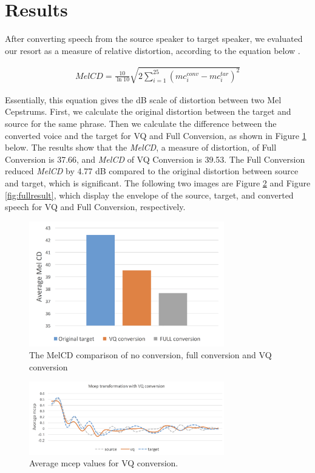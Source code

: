 \section{Results}
\label{sec:results}

After converting speech from the source speaker to target speaker, we evaluated our resort as a measure of relative distortion, according to the equation below \cite{mashimo2001evaluation}.

\begin{align*}
    MelCD = \frac{10}{\ln10}\sqrt{2\sum^{25}_{i=1}(mc_i^{conv} - mc_i^{tar})^2}
\end{align*}

Essentially, this equation gives the dB scale of distortion between two Mel Cepstrums. First, we calculate the original distortion between the target and source for the same phrase. Then we calculate the difference between the converted voice and the target for VQ and Full Conversion, as shown in Figure \ref{fig:melcd} below. The results show that the \textit{MelCD}, a measure of distortion, of Full Conversion is 37.66,  and \textit{MelCD} of VQ Conversion is 39.53. The Full Conversion reduced  \textit{MelCD} by 4.77 dB compared to the original distortion between source and target, which is significant. The following two images are Figure \ref{fig:vqresult} and Figure \ref{fig:fullresult}, which display the envelope of the source, target, and converted speech for VQ and Full Conversion, respectively.

\begin{figure}[htb]
  \centering
  \centerline{\includegraphics[width=8.5cm]{image2}}
\caption{The MelCD comparison of no conversion, full conversion and VQ conversion}
\label{fig:melcd}
%
\end{figure}

\begin{figure}[htb]
\begin{minipage}[b]{1\linewidth}
  \centering
  \centerline{\includegraphics[width=8.5cm]{image4}}
\end{minipage}
\caption{Average mcep values for VQ conversion.}
\label{fig:vqresult}
\end{figure}

